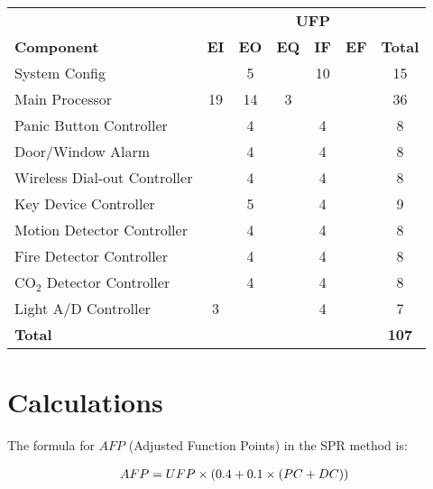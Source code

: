 \documentclass[11pt]{article}
\begin{document}
\begin{center}
  \begin{tabular}[h]{lcccccc}
                                 & \multicolumn{6}{c}{\bf UFP}                                        \\
    {\bf Component}              & {\bf EI} & {\bf EO} & {\bf EQ} & {\bf IF} & {\bf EF} & {\bf Total} \\
    \hline
    System Config                &          & 5        &          & 10       &          & 15          \\
    Main Processor               & 19       & 14       & 3        &          &          & 36          \\
    Panic Button Controller      &          & 4        &          & 4        &          & 8           \\
    Door/Window Alarm            &          & 4        &          & 4        &          & 8           \\
    Wireless Dial-out Controller &          & 4        &          & 4        &          & 8           \\
    Key Device Controller        &          & 5        &          & 4        &          & 9           \\
    Motion Detector Controller   &          & 4        &          & 4        &          & 8           \\
    Fire Detector Controller     &          & 4        &          & 4        &          & 8           \\
    CO$_2$ Detector Controller   &          & 4        &          & 4        &          & 8           \\
    Light A/D Controller         & 3        &          &          & 4        &          & 7           \\
    \hline
    {\bf Total}                  &          &          &          &          &          & {\bf 107}
  \end{tabular}
\end{center}

\section{Calculations}

The formula for $AFP$ (Adjusted Function Points) in the SPR method is:

\begin{align}
  AFP = UFP \times (0.4 + 0.1 \times (PC + DC)) \notag
\end{align}
\end{document}
